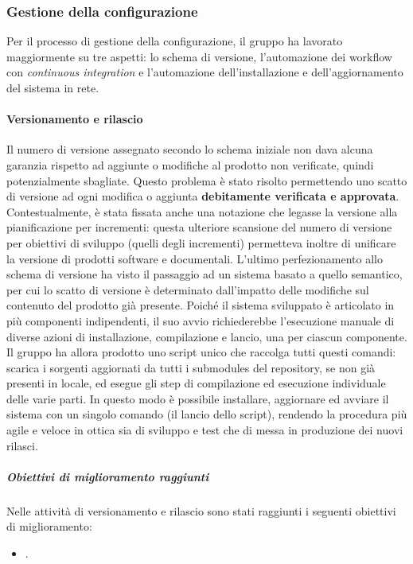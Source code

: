 		\subsubsection{Gestione della configurazione}
			Per il processo di gestione della configurazione, il gruppo ha lavorato maggiormente su tre aspetti: lo schema di versione, l'automazione dei workflow con \textit{continuous integration} e l'automazione dell'installazione e dell'aggiornamento del sistema in rete.
			
			\paragraph{Versionamento e rilascio}
				Il numero di versione assegnato secondo lo schema iniziale non dava alcuna garanzia rispetto ad aggiunte o modifiche al prodotto non verificate, quindi potenzialmente sbagliate. Questo problema è stato risolto permettendo uno scatto di versione ad ogni modifica o aggiunta \textbf{debitamente verificata e approvata}. Contestualmente, è stata fissata anche una notazione che legasse la versione alla pianificazione per incrementi: questa ulteriore scansione del numero di versione per obiettivi di sviluppo (quelli degli incrementi) permetteva inoltre di unificare la versione di prodotti software e documentali. L'ultimo perfezionamento allo schema di versione ha visto il passaggio ad un sistema basato a quello semantico, per cui lo scatto di versione è determinato dall'impatto delle modifiche sul contenuto del prodotto già presente.
				\newline
				Poiché il sistema sviluppato è articolato in più componenti indipendenti, il suo avvio richiederebbe l'esecuzione manuale di diverse azioni di installazione, compilazione e lancio, una per ciascun componente. Il gruppo ha allora prodotto uno script unico che raccolga tutti questi comandi: scarica i sorgenti aggiornati da tutti i submodules del repository, se non già presenti in locale, ed esegue gli step di compilazione ed esecuzione individuale delle varie parti. In questo modo è possibile installare, aggiornare ed avviare il sistema con un singolo comando (il lancio dello script), rendendo la procedura più agile e veloce in ottica sia di sviluppo e test che di messa in produzione dei nuovi rilasci.
				
				\subparagraph{Obiettivi di miglioramento raggiunti}
					Nelle attività di versionamento e rilascio sono stati raggiunti i seguenti obiettivi di miglioramento:
					\begin{itemize}
						\item .
					\end{itemize}
			
